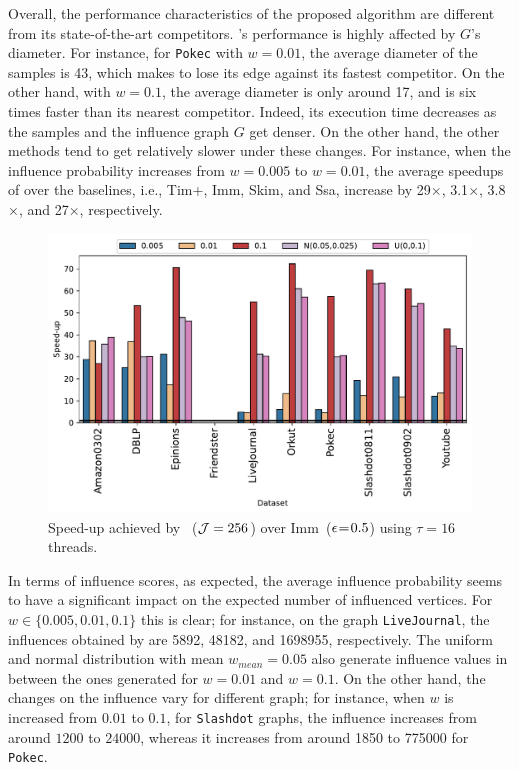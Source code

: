 Overall, the performance characteristics of the proposed algorithm are  different from its state-of-the-art competitors. \acro's performance is highly affected by $G$'s diameter. %
For instance, for {\tt Pokec} with $w = 0.01$, the average diameter of the samples is 43, which makes \acro to lose its edge against its fastest competitor. On the other hand, with $w = 0.1$, the average diameter is only around 17, and \acro is six times faster than its nearest competitor. Indeed, its execution time decreases as the samples and the influence graph $G$ get denser. On the other hand, the other methods tend to get relatively slower under these changes. For instance, when the influence probability increases from $w = 0.005$ to $w = 0.01$, the average speedups of \acro over the baselines, i.e., {\sc Tim+}, {\sc Imm}, {\sc Skim}, and {\sc Ssa}, increase by 29$\times$, 3.1$\times$,  3.8$\times$, and 27$\times$, respectively.

 \begin{figure}[!ht] 
     \centering
     \includegraphics[width=1\linewidth]{images/speedup-imm}
   \centering \caption{Speed-up achieved by \acro{}~(${\cal J} = 256$) over {\sc Imm}~($\epsilon\mkern1.5mu{=}\mkern1.5mu 0.5$) using $\tau=16$ threads.
     \label{fig:vs-imm}} 
 \end{figure}

In terms of influence scores, as expected, the average influence probability seems to have a significant impact on the expected number of influenced vertices. For $w \in \{0.005, 0.01, 0.1\}$ this is clear; for instance, on the graph {\tt LiveJournal}, the influences obtained by \acro{} are 5892, 48182, and 1698955, respectively. The uniform and normal distribution with mean $w_{mean} = 0.05$ also generate influence values in between the ones generated for $w = 0.01$ and $w = 0.1$. On the other hand, the changes on the influence vary for different graph; for instance, when $w$ is increased from $0.01$ to $0.1$, for {\tt Slashdot} graphs, the influence increases from around $1200$ to $24000$, whereas it increases from around 1850 to 775000 for {\tt Pokec}.

